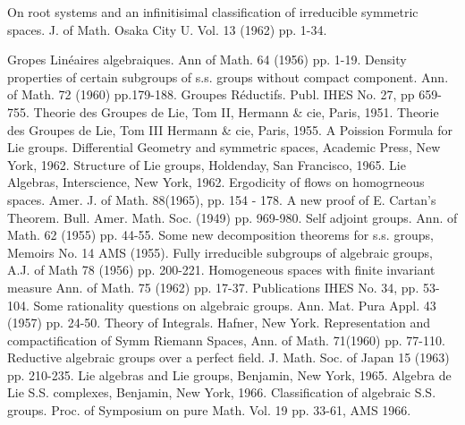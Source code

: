 \begin{thebibliography}{99}
 On root systems and an infinitisimal classification
  of irreducible symmetric spaces. J. of Math. Osaka City U. Vol. 13
  (1962) pp. 1-34.


 Gropes Lin\'eaires algebraiques. Ann of Math. 64
  (1956) pp. 1-19.
 Density properties of certain
  subgroups of s.s. groups without compact component. Ann. of Math. 72
  (1960) pp.179-188. 
 Groupes R\'eductifs. Publ. IHES
  No. 27, pp 659-755.
 Theorie des Groupes de Lie, Tom II, Hermann
  \& cie, Paris, 1951.
 Theorie des Groupes de Lie, Tom III
  Hermann \& cie, Paris, 1955.
 A Poission Formula for Lie groups. 
 Differential Geometry and symmetric spaces,
  Academic Press, New York, 1962.
 Structure of Lie groups, Holdenday, San
  Francisco, 1965.
 Lie Algebras, Interscience, New York, 1962.
 Ergodicity of flows on homogrneous
  spaces. Amer. J. of Math. 88(1965), pp. 154 - 178.
 A new proof of E. Cartan's
  Theorem. Bull. Amer. Math. Soc. (1949) pp. 969-980.
 Self adjoint groups. Ann. of Math. 62 (1955)
  pp. 44-55.
 Some new decomposition theorems for
  s.s. groups, Memoirs No. 14 AMS (1955).
 Fully irreducible subgroups of
  algebraic groups, A.J. of Math 78 (1956) pp. 200-221.
 Homogeneous spaces with finite
  invariant measure Ann. of Math. 75 (1962) pp. 17-37.
 Publications IHES No. 34, pp. 53-104.
 Some rationality questions on algebraic
  groups. Ann. Mat. Pura Appl. 43 (1957) pp. 24-50.
 Theory of Integrals. Hafner, New York.
 Representation and compactification of Symm
  Riemann Spaces, Ann. of Math. 71(1960) pp. 77-110.
 Reductive algebraic groups over a
  perfect field. J. Math. Soc. of Japan 15 (1963) pp. 210-235.
 Lie algebras and Lie groups, Benjamin, New
  York, 1965.
 Algebra de Lie S.S. complexes,
  Benjamin, New York, 1966.
 Classification of algebraic
  S.S. groups. Proc. of Symposium on pure Math. Vol. 19 pp. 33-61, AMS 1966.
\end{thebibliography}
